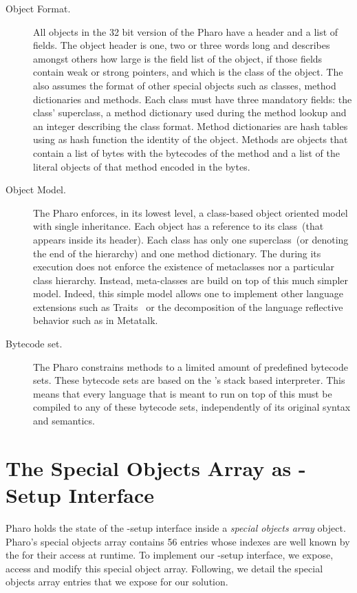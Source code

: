 \begin{description}

\item[Object Format.] All objects in the 32 bit version of the Pharo \VM have a header and a list of fields. The object header is one, two or three words long and describes amongst others how large is the field list of the object, if those fields contain weak or strong pointers, and which is the class of the object. The \VM also assumes the format of other special objects such as classes, method dictionaries and methods. Each class must have three mandatory fields: the class' superclass, a method dictionary used during the method lookup and an integer describing the class format. Method dictionaries are hash tables using as hash function the identity of the object. Methods are objects that contain a list of bytes with the bytecodes of the method and a list of the literal objects of that method encoded in the bytes.

\item[Object Model.] The Pharo \VM enforces, in its lowest level, a class-based object oriented model with single inheritance. Each object has a reference to its class~(that appears inside its header). Each class has only one superclass~(or  denoting the end of the hierarchy) and one method dictionary. The \VM during its execution does not enforce the existence of metaclasses nor a particular class hierarchy. Instead, meta-classes are build on top of this much simpler model. Indeed, this simple model allows one to implement other language extensions such as Traits~\cite{Scha03a} or the decomposition of the language reflective behavior such as in Metatalk\cite{Papo11a}.

\item[Bytecode set.] The Pharo \VM constrains methods to a limited amount of predefined bytecode sets. These bytecode sets are based on the \VM's stack based interpreter. This means that every language that is meant to run on top of this \VM must be compiled to any of these bytecode sets, independently of its original syntax and semantics. 

\end{description}

\section{The Special Objects Array as \VM-Setup Interface}\label{sec:setup_interface}

Pharo \VM holds the state of the \VM-setup interface inside a \emph{special objects array} object. Pharo's special objects array contains 56 entries whose indexes are well known by the \VM for their access at runtime. To implement our \VM-setup interface, we expose, access and modify this special object array. Following, we detail the special objects array entries that we expose for our solution.

